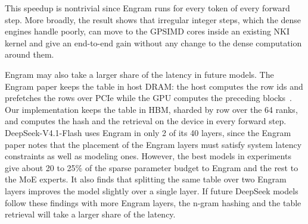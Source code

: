 \documentclass{article}
\begin{document}
This speedup is nontrivial since Engram runs for every token of every forward step. More broadly, the result shows that irregular integer steps, which the dense engines handle poorly, can move to the GPSIMD cores inside an existing NKI kernel and give an end-to-end gain without any change to the dense computation around them.

Engram may also take a larger share of the latency in future models. The Engram paper keeps the table in host DRAM: the host computes the row ids and prefetches the rows over PCIe while the GPU computes the preceding blocks~\citep{engram,engram_code}. Our implementation keeps the table in HBM, sharded by row over the 64 ranks, and computes the hash and the retrieval on the device in every forward step. DeepSeek-V4.1-Flash uses Engram in only 2 of its 40 layers, since the Engram paper notes that the placement of the Engram layers must satisfy system latency constraints as well as modeling ones. However, the best models in experiments give about 20 to 25\% of the sparse parameter budget to Engram and the rest to the MoE experts. It also finds that splitting the same table over two Engram layers improves the model slightly over a single layer. If future DeepSeek models follow these findings with more Engram layers, the n-gram hashing and the table retrieval will take a larger share of the latency.
\end{document}

